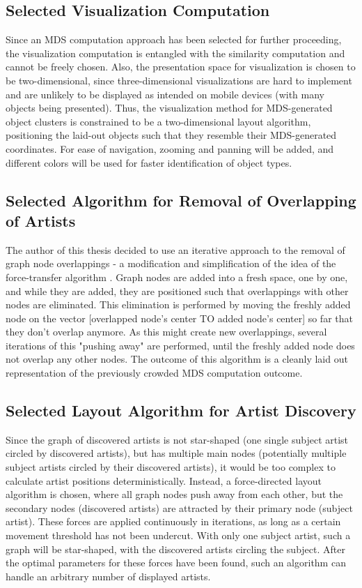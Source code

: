 \subsection{Selected Visualization Computation}

Since an MDS computation approach has been selected for further proceeding, the visualization computation is entangled with the similarity computation and cannot be freely chosen. Also, the presentation space for visualization is chosen to be two-dimensional, since three-dimensional visualizations are hard to implement and are unlikely to be displayed as intended on mobile devices (with many objects being presented). Thus, the visualization method for MDS-generated object clusters is constrained to be a two-dimensional layout algorithm, positioning the laid-out objects such that they resemble their MDS-generated coordinates. For ease of navigation, zooming and panning will be added, and different colors will be used for faster identification of object types.

\subsection{Selected Algorithm for Removal of Overlapping of Artists}

The author of this thesis decided to use an iterative approach to the removal of graph node overlappings - a modification and simplification of the idea of the force-transfer algorithm \cite{Huang03force-transfer:a}. Graph nodes are added into a fresh space, one by one, and while they are added, they are positioned such that overlappings with other nodes are eliminated. This elimination is performed by moving the freshly added node on the vector [overlapped node's center TO added node's center] so far that they don't overlap anymore. As this might create new overlappings, several iterations of this "pushing away" are performed, until the freshly added node does not overlap any other nodes. The outcome of this algorithm is a cleanly laid out representation of the previously crowded MDS computation outcome.

\subsection{Selected Layout Algorithm for Artist Discovery}

Since the graph of discovered artists is not star-shaped (one single subject artist circled by discovered artists), but has multiple main nodes (potentially multiple subject artists circled by their discovered artists), it would be too complex to calculate artist positions deterministically. Instead, a force-directed layout algorithm is chosen, where all graph nodes push away from each other, but the secondary nodes (discovered artists) are attracted by their primary node (subject artist). These forces are applied continuously in iterations, as long as a certain movement threshold has not been undercut. With only one subject artist, such a graph will be star-shaped, with the discovered artists circling the subject. After the optimal parameters for these forces have been found, such an algorithm can handle an arbitrary number of displayed artists.

